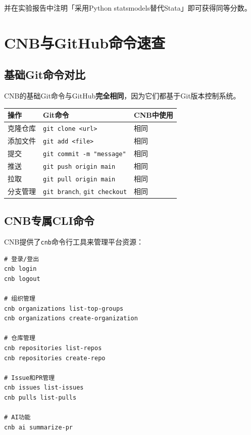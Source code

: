 并在实验报告中注明「采用Python statsmodels替代Stata」即可获得同等分数。


\chapter{CNB与GitHub命令速查}

\section{基础Git命令对比}

CNB的基础Git命令与GitHub\textbf{完全相同}，因为它们都基于Git版本控制系统。

\begin{table}[H]
\centering
\begin{tabular}{lll}
\toprule
\textbf{操作} & \textbf{Git命令} & \textbf{CNB中使用} \\
\midrule
克隆仓库 & \texttt{git clone <url>} & 相同 \\
添加文件 & \texttt{git add <file>} & 相同 \\
提交 & \texttt{git commit -m "message"} & 相同 \\
推送 & \texttt{git push origin main} & 相同 \\
拉取 & \texttt{git pull origin main} & 相同 \\
分支管理 & \texttt{git branch}, \texttt{git checkout} & 相同 \\
\bottomrule
\end{tabular}
\end{table}

\section{CNB专属CLI命令}

CNB提供了\texttt{cnb}命令行工具来管理平台资源：

\begin{lstlisting}[style=shell]
# 登录/登出
cnb login
cnb logout

# 组织管理
cnb organizations list-top-groups
cnb organizations create-organization

# 仓库管理
cnb repositories list-repos
cnb repositories create-repo

# Issue和PR管理
cnb issues list-issues
cnb pulls list-pulls

# AI功能
cnb ai summarize-pr
\end{lstlisting}

